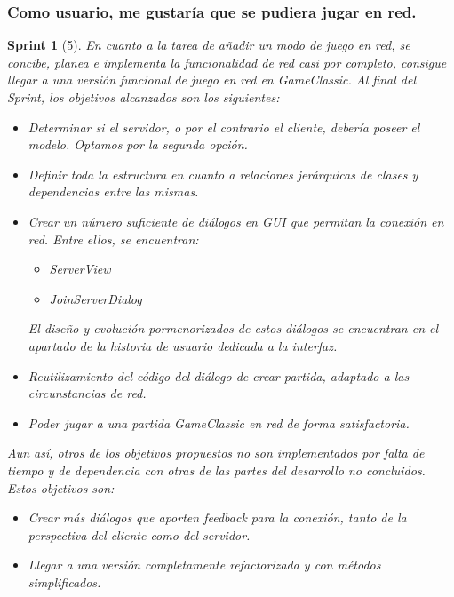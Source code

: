 \documentclass{article}
\theoremstyle{break}
\newtheorem*{sprint}{Sprint}
\begin{document}
\subsubsection{Como usuario, me gustaría que se pudiera jugar en red.}
\begin{sprint}[5]
En cuanto a la tarea de añadir un modo de juego en red, se concibe, planea e implementa la funcionalidad de red casi por completo, consigue llegar a una versión funcional de juego en red en GameClassic. Al final del Sprint, los objetivos alcanzados son los siguientes:

\begin{itemize}
\item Determinar si el servidor, o por el contrario el cliente, debería poseer el modelo. Optamos por la segunda opción.

\item Definir toda la estructura en cuanto a relaciones jerárquicas de clases y dependencias entre las mismas.

\item Crear un número suficiente de diálogos en GUI que permitan la conexión en red. Entre ellos, se encuentran:
\begin{itemize}
\item ServerView
\item JoinServerDialog
\end{itemize}

El diseño y evolución pormenorizados de estos diálogos se encuentran en el apartado de la historia de usuario dedicada a la interfaz.

\item Reutilizamiento del código del diálogo de crear partida, adaptado a las circunstancias de red.

\item Poder jugar a una partida GameClassic en red de forma satisfactoria.

\end{itemize}

Aun así, otros de los objetivos propuestos no son implementados por falta de tiempo y de dependencia con otras de las partes del desarrollo no concluidos. Estos objetivos son:

\begin{itemize}
\item Crear más diálogos que aporten feedback para la conexión, tanto de la perspectiva del cliente como del servidor.

\item Llegar a una versión completamente refactorizada y con métodos simplificados.


\end{itemize}
\end{sprint}
\end{document}
